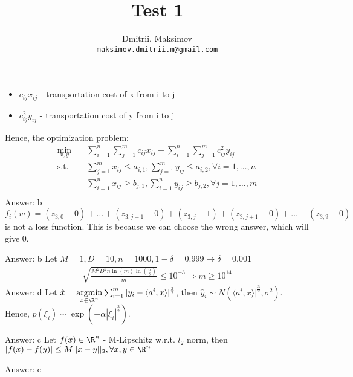 \documentclass{homework}
\title{Test 1}
\author{
  Dmitrii, Maksimov\\
  \texttt{maksimov.dmitrii.m@gmail.com}
}
\begin{document}
\maketitle

\exercise
\begin{itemize}
	\item $c_{ij}x_{ij}$ - transportation cost of x from i to j
	\item $c_{ij}^2y_{ij}$ - transportation cost of y from i to j
\end{itemize}
Hence, the optimization problem:
\begin{align*}
	\min_{x,y} \quad
	&\sum_{i=1}^n\sum_{j=1}^mc_{ij}x_{ij} + \sum_{i=1}^n\sum_{j=1}^mc_{ij}^2y_{ij} \\
	\text{s.t.} \quad
	&\sum_{j=1}^mx_{ij}\leq a_{i,1}, \sum_{j=1}^my_{ij}\leq a_{i,2}, \forall i = 1,\dots ,n\\
	&\sum_{i=1}^nx_{ij}\geq b_{j,1}, \sum_{i=1}^ny_{ij}\geq b_{j,2}, \forall j = 1,\dots ,m\\
\end{align*}
Answer: b
\exercise*
$f_i(w) = (z_{3,0}-0) + \ldots + (z_{3,j-1}-0) +(z_{3,j}-1) +(z_{3,j+1}-0) + \ldots +(z_{3,9}-0)$ is not a loss function. This is because we can choose the wrong answer, which will give 0.

Answer: b
\exercise*
Let $M = 1, D = 10, n=1000, 1 - \delta = 0.999 \rightarrow \delta = 0.001$
\begin{align*}
\sqrt{\frac{M^2D^2n\ln(m)\ln(\frac{n}{\delta})}{m}}\leq10^{-3} \Longrightarrow m \geq 10^{14}
\end{align*}
Answer: d
\exercise*
Let $\hat{x} =\underset{x\in\R^n}{\mathrm{argmin}} \sum_{i=1}^m|y_i - \langle a^i, x\rangle|^{\frac{3}{2}}$, then $\hat{y}_i \sim N(\langle a^i, x\rangle|^{\frac{3}{2}}, \sigma^2)$. Hence, $p(\xi_i) \sim \exp(-\alpha|\xi_i|^{\frac{3}{2}})$.

Answer: c
\exercise*
Let $f(x) \in \R^n$ - M-Lipschitz w.r.t. $l_2$ norm, then $|f(x) - f(y)| \leq M||x-y||_2, \forall x,y \in \R^n$

Answer: c
\end{document}
